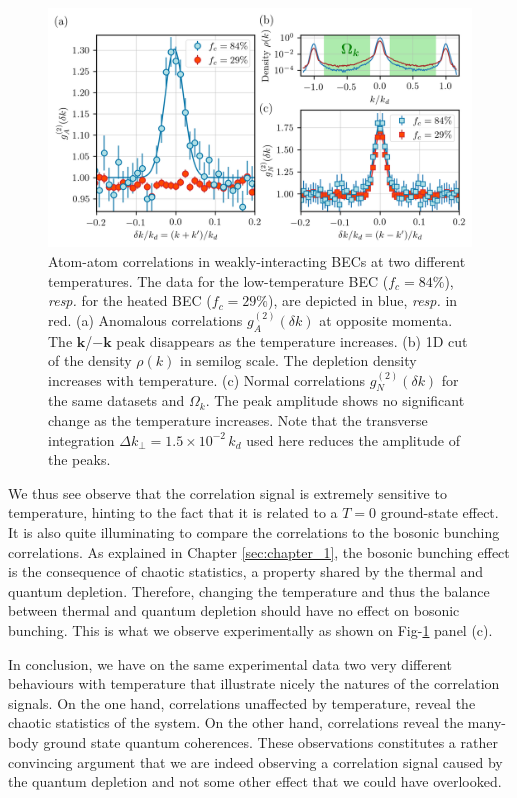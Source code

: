 \begin{figure}
    \centering
    \includegraphics[width=\textwidth]{Fig/Chapter4/kmk_temperature.png}
    \caption[Atom-atom correlations in weakly-interacting BECs at two different temperatures]{Atom-atom correlations in weakly-interacting BECs at two different temperatures. The data for the low-temperature BEC ($f_{c}=84\%$), {\it resp.} for the heated BEC ($f_{c}=29\%$), are depicted in blue, {\it resp.} in red. 
    {(a)} Anomalous correlations $g_{A}^{(2)}(\delta k)$ at opposite momenta. The ${\bm k}$/$-{\bm k}$ peak disappears as the temperature increases.
    {(b)} 1D cut of the density $\rho(k)$ in semilog scale. The depletion density increases with temperature.
    {(c)} Normal correlations $g_{N}^{(2)}(\delta k)$ for the same datasets and $\Omega_k$. The peak amplitude shows no significant change as the temperature increases. Note that the transverse integration $\Delta k_{\perp}=1.5 \times 10^{-2} \, k_d$ used here reduces the amplitude of the peaks.}
    \label{fig:kmk_temperature}
\end{figure}

We thus see observe that the \kmk correlation signal is extremely sensitive to temperature, hinting to the fact that it is related to a $T=0$ ground-state effect. It is also quite illuminating to compare the \kmk correlations to the bosonic bunching \kk correlations. As explained in Chapter \ref{sec:chapter_1}, the bosonic bunching effect is the consequence of chaotic statistics, a property shared by the thermal and quantum depletion. Therefore, changing the temperature and thus the balance between thermal and quantum depletion should have no effect on bosonic bunching. This is what we observe experimentally as shown on Fig-\ref{fig:kmk_temperature} panel (c).

In conclusion, we have on the same experimental data two very different behaviours with temperature that illustrate nicely the natures of the correlation signals. On the one hand, \kk correlations unaffected by temperature, reveal the chaotic statistics of the system. On the other hand, \kmk correlations reveal the many-body ground state quantum coherences. These observations constitutes a rather convincing argument that we are indeed observing a \kmk correlation signal caused by the quantum depletion and not some other effect that we could have overlooked.

